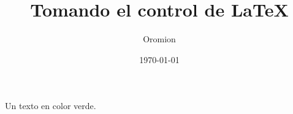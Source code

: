 \documentclass{article}
\title{Tomando el control de \LaTeX{}}
\author{Oromion}
\date{\today}
\begin{document}
\maketitle
\textcolor{myGreen}{Un texto en color verde.}
\end{document}
